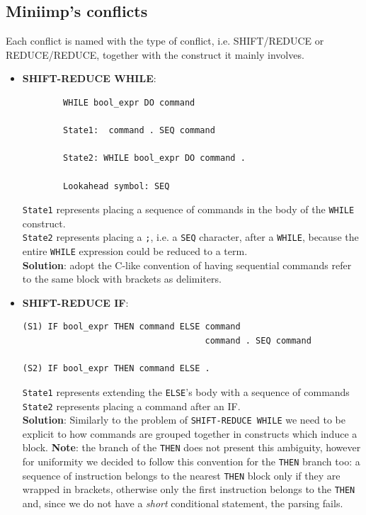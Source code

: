 \documentclass[a4paper,11pt]{report}
\begin{document}
\subsection{Miniimp's conflicts}

Each conflict is named with the type of conflict, i.e. SHIFT/REDUCE or REDUCE/REDUCE, together with the construct it mainly involves.
\begin{itemize}
    \item \textbf{SHIFT-REDUCE WHILE}: 
    \begin{lstlisting}
        WHILE bool_expr DO command

        State1:  command . SEQ command

        State2: WHILE bool_expr DO command .
    
        Lookahead symbol: SEQ
    \end{lstlisting}
\verb|State1| represents placing a sequence of commands in the body of the \verb|WHILE| construct.\\
\verb|State2| represents placing a \verb|;|, i.e. a \verb|SEQ| character, after a \verb|WHILE|, because the entire \verb|WHILE| expression could be reduced to a term.\\
\textbf{Solution}: adopt the C-like convention of having sequential commands refer to the same block with brackets as delimiters.

    \item \textbf{SHIFT-REDUCE IF}:
    \begin{lstlisting}
(S1) IF bool_expr THEN command ELSE command
                                    command . SEQ command

(S2) IF bool_expr THEN command ELSE .
    \end{lstlisting}
    \verb|State1| represents extending the \verb|ELSE|'s body with a sequence of commands\\
    \verb|State2| represents placing a command after an IF.\\
    \textbf{Solution}: 
    Similarly to the problem of \verb|SHIFT-REDUCE WHILE| we need to be explicit to how commands are grouped together in constructs which induce a block. \textbf{Note}: the branch of the \verb|THEN| does not present this ambiguity, however for uniformity we decided to follow this convention for the \verb|THEN| branch too: a sequence of instruction belongs to the nearest \verb|THEN| block only if they are wrapped in brackets, otherwise only the first instruction belongs to the \verb|THEN| and, since we do not have a \textit{short} conditional statement, the parsing fails. 
    

\end{itemize}
\end{document}
